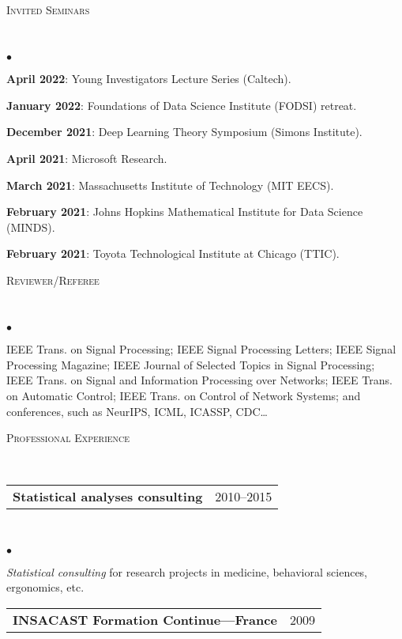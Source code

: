 \documentclass[a4paper,11pt]{article}
\makeatletter
\newcommand{\CVheading}[1]{
	\vspace{10pt}
	{ \large
	\begin{minipage}{\textwidth}
		\textsc{#1 \vphantom{p\^{E}}}
	\end{minipage} } \\
	\vspace{5pt}
}
\newcommand{\CVsubheading}[2]{
	\begin{tabular*}{\textwidth}{l@{\extracolsep{\fill}}r}
		\textbf{#1} & #2 \\
	\end{tabular*} \\
}
\newcommand{\CVlist}{
	\begin{list}{$\bullet$}{
	\setlength{\itemsep}{0pt}
	\setlength{\parsep}{1pt}
	\setlength{\topsep}{1pt}
	\setlength{\partopsep}{0pt}
	\setlength{\leftmargin}{24pt}
	\setlength{\labelwidth}{1em} }
}
\newcommand{\CVlistend}{
	\end{list}
	\vspace{3pt}
}
\makeatother
\begin{document}
\CVheading{Invited Seminars}

	\CVlist
	\item \textbf{April 2022}: Young Investigators Lecture Series (Caltech).

	\item \textbf{January 2022}: Foundations of Data Science Institute (FODSI) retreat.

	\item \textbf{December 2021}: Deep Learning Theory Symposium (Simons Institute).

	\item \textbf{April 2021}: Microsoft Research.

	\item \textbf{March 2021}: Massachusetts Institute of Technology (MIT EECS).

	\item \textbf{February 2021}: Johns Hopkins Mathematical Institute for Data Science (MINDS).

	\item \textbf{February 2021}: Toyota Technological Institute at Chicago (TTIC).

	\CVlistend



\CVheading{Reviewer/Referee}

	\CVlist

	\item IEEE Trans. on Signal Processing; IEEE Signal Processing Letters; IEEE Signal Processing Magazine; IEEE Journal of Selected Topics in Signal Processing; IEEE Trans. on Signal and Information Processing over Networks; IEEE Trans. on Automatic Control; IEEE Trans. on Control of Network Systems; and conferences, such as NeurIPS, ICML, ICASSP, CDC\dots

	\CVlistend





\CVheading{Professional Experience}


\CVsubheading{Statistical analyses consulting}{2010--2015}

	\CVlist

	\item
	\textit{Statistical consulting} for research projects in medicine, behavioral sciences, ergonomics, etc.

	\CVlistend


\CVsubheading{INSACAST Formation Continue---France}{2009}
\end{document}
